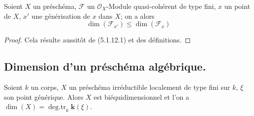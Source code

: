\begin{proposition}[5.1.13]
\label{IV.2.5.1.13-fr}
Soient $X$ un préschéma, $\mathcal F$ un $\mathcal O_X$-Module
quasi-cohérent de type fini, $x$ un point de $X$, $x'$ une générisation de
$x$ dans $X$; on a alors
\begin{equation}
\dim(\mathcal F_{x'})\leq\dim(\mathcal F_x)
\tag{5.1.13.1}\label{IV.2.5.1.13.1-fr}
\end{equation}
\end{proposition}

\begin{proof}
Cela résulte aussitôt de (5.1.12.1) et des définitions.
\end{proof}

\subsection{Dimension d'un préschéma algébrique.}

\begin{proposition}[5.2.1]
\label{IV.2.5.2.1-fr}
Soient $k$ un corps, $X$ un préschéma irréductible localement de type fini sur
$k$, $\xi$ son point générique. Alors $X$ est biéquidimensionnel et l'on a
$\dim(X)=\operatorname{deg.tr}_k \boldsymbol{k}(\xi)$.
\end{proposition}

